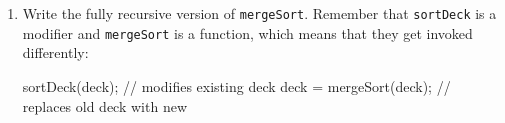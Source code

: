 \begin{exercise}
\begin{enumerate}
\item Write the fully recursive version of {\tt mergeSort}.
Remember that {\tt sortDeck} is a modifier and {\tt mergeSort} is
a function, which means that they get invoked differently:

\begin{code}
sortDeck(deck);              // modifies existing deck
deck = mergeSort(deck);      // replaces old deck with new
\end{code}

\end{enumerate}
\end{exercise}




